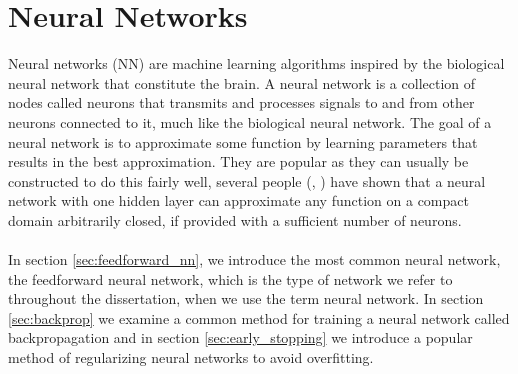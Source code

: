 \chapter{Neural Networks}\label{sec:neural_network}
Neural networks (NN) are machine learning algorithms inspired by the biological neural network that constitute the brain. A neural network is a collection of nodes called neurons that transmits and processes signals to and from other neurons connected to it, much like the biological neural network. The goal of a neural network is to approximate some function by learning parameters that results in the best approximation. They are popular as they can usually be constructed to do this fairly well, several people (\cite{Cybenko1989}, \cite{Funahashi1989}) have shown that a neural network with one hidden layer can approximate any function on a compact domain arbitrarily closed, if provided with a sufficient number of neurons.
\\
\\
In section \ref{sec:feedforward_nn}, we introduce the most common neural network, the feedforward neural network, which is the type of network we refer to throughout the dissertation, when we use the term neural network. In section \ref{sec:backprop} we examine a common method for training a neural network called backpropagation and in section \ref{sec:early_stopping} we introduce a popular method of regularizing neural networks to avoid overfitting. 

